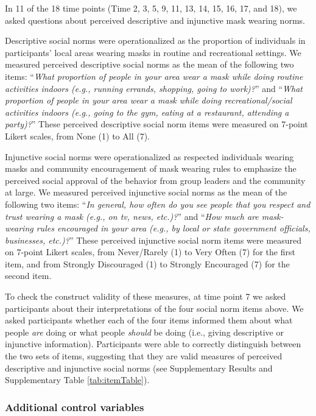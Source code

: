 \documentclass[
  man, donotrepeattitle,mask,floatsintext]{apa6}
\begin{document}
In 11 of the 18 time points (Time 2, 3, 5, 9, 11, 13, 14, 15, 16, 17, and 18), we asked questions about perceived descriptive and injunctive mask wearing norms.

Descriptive social norms were operationalized as the proportion of individuals in participants' local areas wearing masks in routine and recreational settings. We measured perceived descriptive social norms as the mean of the following two items: ``\emph{What proportion of people in your area wear a mask while doing routine activities indoors (e.g., running errands, shopping, going to work)?}'' and ``\emph{What proportion of people in your area wear a mask while doing recreational/social activities indoors (e.g., going to the gym, eating at a restaurant, attending a party)?}'' These perceived descriptive social norm items were measured on 7-point Likert scales, from None (1) to All (7).

Injunctive social norms were operationalized as respected individuals wearing masks and community encouragement of mask wearing rules to emphasize the perceived social approval of the behavior from group leaders and the community at large. We measured perceived injunctive social norms as the mean of the following two items: ``\emph{In general, how often do you see people that you respect and trust wearing a mask (e.g., on tv, news, etc.)?}'' and ``\emph{How much are mask-wearing rules encouraged in your area (e.g., by local or state government officials, businesses, etc.)?}'' These perceived injunctive social norm items were measured on 7-point Likert scales, from Never/Rarely (1) to Very Often (7) for the first item, and from Strongly Discouraged (1) to Strongly Encouraged (7) for the second item.

To check the construct validity of these measures, at time point 7 we asked participants about their interpretations of the four social norm items above. We asked participants whether each of the four items informed them about what people \emph{are} doing or what people \emph{should} be doing (i.e., giving descriptive or injunctive information). Participants were able to correctly distinguish between the two sets of items, suggesting that they are valid measures of perceived descriptive and injunctive social norms (see Supplementary Results and Supplementary Table \ref{tab:itemTable}).

\hypertarget{additional-control-variables}{%
\subsubsection{Additional control variables}\label{additional-control-variables}}
\end{document}
